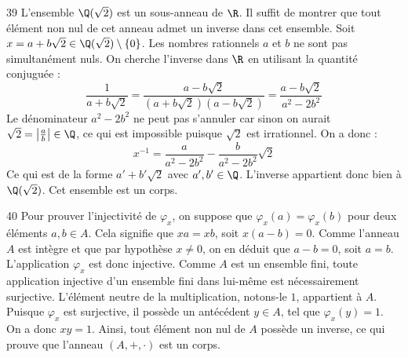 \begin{correction}{39}
L'ensemble $\Q(\sqrt{2})$ est un sous-anneau de $\R$. Il suffit de montrer que tout élément non nul de cet anneau admet un inverse dans cet ensemble.
Soit $x = a+b\sqrt{2} \in \Q(\sqrt{2}) \setminus \{0\}$. Les nombres rationnels $a$ et $b$ ne sont pas simultanément nuls.
On cherche l'inverse dans $\R$ en utilisant la quantité conjuguée :
\[\frac{1}{a+b\sqrt{2}} = \frac{a-b\sqrt{2}}{(a+b\sqrt{2})(a-b\sqrt{2})} = \frac{a-b\sqrt{2}}{a^2-2b^2}\]
Le dénominateur $a^2-2b^2$ ne peut pas s'annuler car sinon on aurait $\sqrt{2} = \left| \frac{a}{b} \right| \in \Q$, ce qui est impossible puisque $\sqrt{2}$ est irrationnel.
On a donc :
\[x^{-1} = \frac{a}{a^2-2b^2} - \frac{b}{a^2-2b^2}\sqrt{2}\]
Ce qui est de la forme $a' + b'\sqrt{2}$ avec $a',b' \in \Q$. L'inverse appartient donc bien à $\Q(\sqrt{2})$. Cet ensemble est un corps.
\end{correction}

\begin{correction}{40}
Pour prouver l'injectivité de $\varphi_x$, on suppose que $\varphi_x(a) = \varphi_x(b)$ pour deux éléments $a,b \in A$.
Cela signifie que $xa = xb$, soit $x(a-b) = 0$.
Comme l'anneau $A$ est intègre et que par hypothèse $x \neq 0$, on en déduit que $a-b=0$, soit $a=b$. L'application $\varphi_x$ est donc injective.
Comme $A$ est un ensemble fini, toute application injective d'un ensemble fini dans lui-même est nécessairement surjective.
L'élément neutre de la multiplication, notons-le $1$, appartient à $A$. Puisque $\varphi_x$ est surjective, il possède un antécédent $y \in A$, tel que $\varphi_x(y) = 1$.
On a donc $xy = 1$.
Ainsi, tout élément non nul de $A$ possède un inverse, ce qui prouve que l'anneau $(A, +, \cdot)$ est un corps.
\end{correction}
